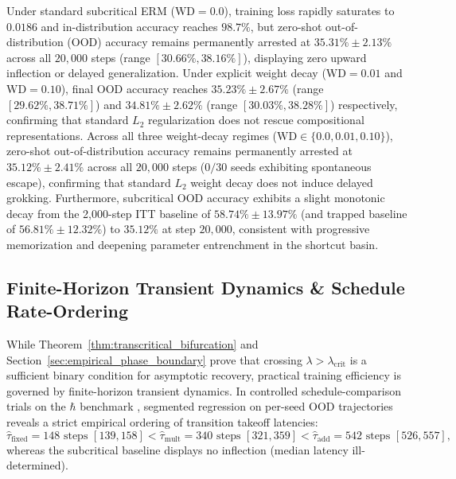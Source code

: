 \documentclass{article}
\theoremstyle{plain}
\theoremstyle{definition}
\begin{document}
Under standard subcritical ERM ($\text{WD}=0.0$), training loss rapidly saturates to $0.0186$ and in-distribution accuracy reaches $98.7\%$, but zero-shot out-of-distribution (OOD) accuracy remains permanently arrested at $35.31\% \pm 2.13\%$ across all $20{,}000$ steps (range $[30.66\%, 38.16\%]$), displaying zero upward inflection or delayed generalization. Under explicit weight decay ($\text{WD}=0.01$ and $\text{WD}=0.10$), final OOD accuracy reaches $35.23\% \pm 2.67\%$ (range $[29.62\%, 38.71\%]$) and $34.81\% \pm 2.62\%$ (range $[30.03\%, 38.28\%]$) respectively, confirming that standard $L_2$ regularization does not rescue compositional representations. Across all three weight-decay regimes ($\text{WD} \in \{0.0, 0.01, 0.10\}$), zero-shot out-of-distribution accuracy remains permanently arrested at $35.12\% \pm 2.41\%$ across all $20{,}000$ steps ($0/30$ seeds exhibiting spontaneous escape), confirming that standard $L_2$ weight decay does not induce delayed grokking. Furthermore, subcritical OOD accuracy exhibits a slight monotonic decay from the 2,000-step ITT baseline of $58.74\% \pm 13.97\%$ (and trapped baseline of $56.81\% \pm 12.32\%$) to $35.12\%$ at step $20{,}000$, consistent with progressive memorization and deepening parameter entrenchment in the shortcut basin.

\subsection{Finite-Horizon Transient Dynamics \& Schedule Rate-Ordering}
\label{sec:rate_ordering}
While Theorem~\ref{thm:transcritical_bifurcation} and Section~\ref{sec:empirical_phase_boundary} prove that crossing $\lambda > \lambda_{\text{crit}}$ is a sufficient binary condition for asymptotic recovery, practical training efficiency is governed by finite-horizon transient dynamics. In controlled schedule-comparison trials on the $\hbar$ benchmark \citep{Basri2026CompositionalPreprint}, segmented regression on per-seed OOD trajectories reveals a strict empirical ordering of transition takeoff latencies:
\begin{equation}
    \hat{\tau}_{\text{fixed}} = 148\text{ steps } [139, 158] < \hat{\tau}_{\text{mult}} = 340\text{ steps } [321, 359] < \hat{\tau}_{\text{add}} = 542\text{ steps } [526, 557],
    \label{eq:rate_ordering}
\end{equation}
whereas the subcritical baseline displays no inflection (median latency ill-determined).
\end{document}
